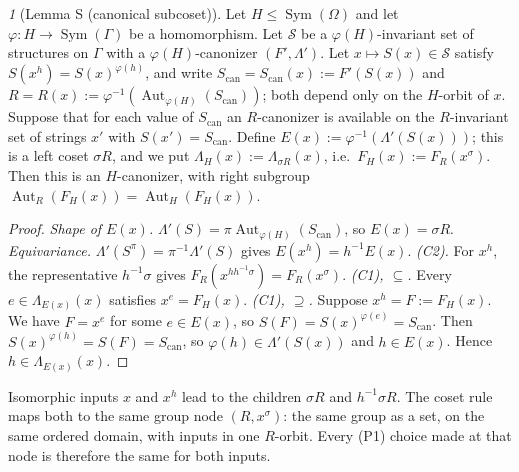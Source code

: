 \documentclass[11pt]{article}
\theoremstyle{plain}
\theoremstyle{definition}
\theoremstyle{remark}
\theoremstyle{named}
\newtheorem*{named}{}
\theoremstyle{namedrm}
\newcommand{\Sym}{\operatorname{Sym}}
\newcommand{\Aut}{\operatorname{Aut}}
\newcommand{\cS}{\mathcal{S}}
\begin{document}
\begin{named}[Lemma S (canonical subcoset)]
Let $H\le\Sym(\Omega)$ and let $\varphi\colon H\to\Sym(\Gamma)$ be a homomorphism. Let $\cS$ be a
$\varphi(H)$-invariant set of structures on $\Gamma$ with a $\varphi(H)$-canonizer $(F',\Lambda')$. Let
$x\mapsto S(x)\in\cS$ satisfy $S(x^h)=S(x)^{\varphi(h)}$, and write $S_{\mathrm{can}}=S_{\mathrm{can}}(x):=F'(S(x))$
and $R=R(x):=\varphi^{-1}(\Aut_{\varphi(H)}(S_{\mathrm{can}}))$; both depend only on the $H$-orbit of $x$.
Suppose that for each value of $S_{\mathrm{can}}$ an $R$-canonizer is available on the $R$-invariant set of
strings $x'$ with $S(x')=S_{\mathrm{can}}$. Define $E(x):=\varphi^{-1}(\Lambda'(S(x)))$; this is a left coset
$\sigma R$, and we put $\Lambda_H(x):=\Lambda_{\sigma R}(x)$, i.e.\ $F_H(x):=F_R(x^\sigma)$. Then this is an
$H$-canonizer, with right subgroup $\Aut_R(F_H(x))=\Aut_H(F_H(x))$.
\end{named}
\begin{proof}
\emph{Shape of $E(x)$.} $\Lambda'(S)=\pi\Aut_{\varphi(H)}(S_{\mathrm{can}})$, so $E(x)=\sigma R$.
\emph{Equivariance.} $\Lambda'(S^\pi)=\pi^{-1}\Lambda'(S)$ gives $E(x^h)=h^{-1}E(x)$.
\emph{(C2).} For $x^h$, the representative $h^{-1}\sigma$ gives $F_R(x^{hh^{-1}\sigma})=F_R(x^\sigma)$.
\emph{(C1), $\subseteq$.} Every $e\in\Lambda_{E(x)}(x)$ satisfies $x^e=F_H(x)$.
\emph{(C1), $\supseteq$.} Suppose $x^h=F:=F_H(x)$. We have $F=x^e$ for some $e\in E(x)$, so
$S(F)=S(x)^{\varphi(e)}=S_{\mathrm{can}}$. Then $S(x)^{\varphi(h)}=S(F)=S_{\mathrm{can}}$, so $\varphi(h)\in\Lambda'(S(x))$
and $h\in E(x)$. Hence $h\in\Lambda_{E(x)}(x)$.
\end{proof}

Isomorphic inputs $x$ and $x^h$ lead to the children $\sigma R$ and $h^{-1}\sigma R$. The coset rule maps both
to the same group node $(R,x^\sigma)$: the same group as a set, on the same ordered domain, with inputs
in one $R$-orbit. Every (P1) choice made at that node is therefore the same for both inputs.
\end{document}

